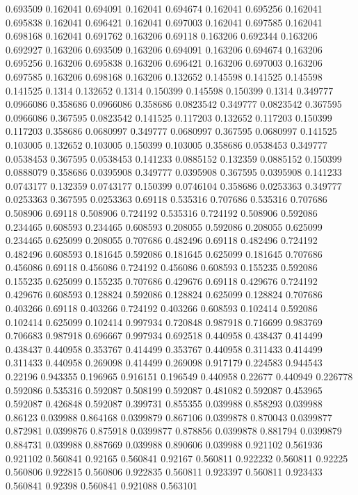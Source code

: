 0.693509 0.162041
0.694091 0.162041
0.694674 0.162041
0.695256 0.162041
0.695838 0.162041
0.696421 0.162041
0.697003 0.162041
0.697585 0.162041
0.698168 0.162041
0.691762 0.163206
0.69118 0.163206
0.692344 0.163206
0.692927 0.163206
0.693509 0.163206
0.694091 0.163206
0.694674 0.163206
0.695256 0.163206
0.695838 0.163206
0.696421 0.163206
0.697003 0.163206
0.697585 0.163206
0.698168 0.163206
0.132652 0.145598
0.141525 0.145598
0.141525 0.1314
0.132652 0.1314
0.150399 0.145598
0.150399 0.1314
0.349777 0.0966086
0.358686 0.0966086
0.358686 0.0823542
0.349777 0.0823542
0.367595 0.0966086
0.367595 0.0823542
0.141525 0.117203
0.132652 0.117203
0.150399 0.117203
0.358686 0.0680997
0.349777 0.0680997
0.367595 0.0680997
0.141525 0.103005
0.132652 0.103005
0.150399 0.103005
0.358686 0.0538453
0.349777 0.0538453
0.367595 0.0538453
0.141233 0.0885152
0.132359 0.0885152
0.150399 0.0888079
0.358686 0.0395908
0.349777 0.0395908
0.367595 0.0395908
0.141233 0.0743177
0.132359 0.0743177
0.150399 0.0746104
0.358686 0.0253363
0.349777 0.0253363
0.367595 0.0253363
0.69118 0.535316
0.707686 0.535316
0.707686 0.508906
0.69118 0.508906
0.724192 0.535316
0.724192 0.508906
0.592086 0.234465
0.608593 0.234465
0.608593 0.208055
0.592086 0.208055
0.625099 0.234465
0.625099 0.208055
0.707686 0.482496
0.69118 0.482496
0.724192 0.482496
0.608593 0.181645
0.592086 0.181645
0.625099 0.181645
0.707686 0.456086
0.69118 0.456086
0.724192 0.456086
0.608593 0.155235
0.592086 0.155235
0.625099 0.155235
0.707686 0.429676
0.69118 0.429676
0.724192 0.429676
0.608593 0.128824
0.592086 0.128824
0.625099 0.128824
0.707686 0.403266
0.69118 0.403266
0.724192 0.403266
0.608593 0.102414
0.592086 0.102414
0.625099 0.102414
0.997934 0.720848
0.987918 0.716699
0.983769 0.706683
0.987918 0.696667
0.997934 0.692518
0.440958 0.438437
0.414499 0.438437
0.440958 0.353767
0.414499 0.353767
0.440958 0.311433
0.414499 0.311433
0.440958 0.269098
0.414499 0.269098
0.917179 0.224583
0.944543 0.22196
0.943355 0.196965
0.916151 0.196549
0.440958 0.22677
0.440949 0.226778
0.592086 0.535316
0.592087 0.508199
0.592087 0.481082
0.592087 0.453965
0.592087 0.426848
0.592087 0.399731
0.855355 0.039988
0.858293 0.039988
0.86123 0.039988
0.864168 0.0399879
0.867106 0.0399878
0.870043 0.0399877
0.872981 0.0399876
0.875918 0.0399877
0.878856 0.0399878
0.881794 0.0399879
0.884731 0.039988
0.887669 0.039988
0.890606 0.039988
0.921102 0.561936
0.921102 0.560841
0.92165 0.560841
0.92167 0.560811
0.922232 0.560811
0.92225 0.560806
0.922815 0.560806
0.922835 0.560811
0.923397 0.560811
0.923433 0.560841
0.92398 0.560841
0.921088 0.563101
